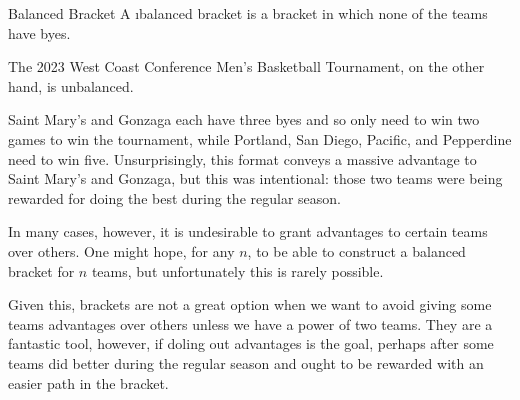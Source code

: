 {\begin{definition}{Balanced Bracket}{}
    A \i{balanced bracket} is a bracket in which none of the teams have byes.
\end{definition} 

The 2023 West Coast Conference Men's Basketball Tournament, on the other hand, is unbalanced.

Saint Mary's and Gonzaga each have three byes and so only need to win two games to win the tournament, while Portland, San Diego, Pacific, and Pepperdine need to win five. Unsurprisingly, this format conveys a massive advantage to Saint Mary's and Gonzaga, but this was intentional: those two teams were being rewarded for doing the best during the regular season.

In many cases, however, it is undesirable to grant advantages to certain teams over others. One might hope, for any $n$, to be able to construct a balanced bracket for $n$ teams, but unfortunately this is rarely possible.


Given this, brackets are not a great option when we want to avoid giving some teams advantages over others unless we have a power of two teams. They are a fantastic tool, however, if doling out advantages is the goal, perhaps after some teams did better during the regular season and ought to be rewarded with an easier path in the bracket.
}